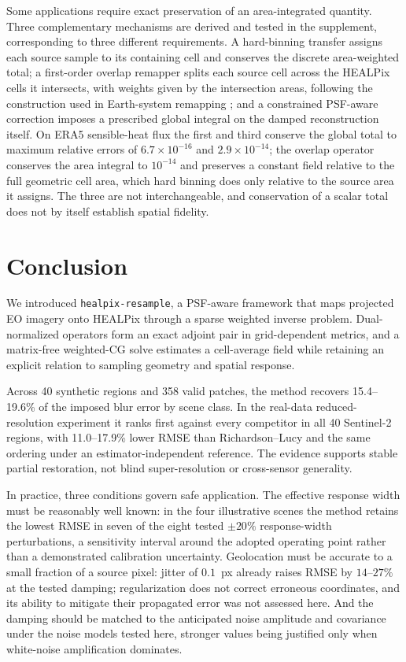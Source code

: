 \documentclass[journal]{IEEEtran}
\newcommand{\healpix}{HEALPix\xspace}
\begin{document}
Some applications require exact preservation of an area-integrated quantity.
Three complementary mechanisms are derived and tested in the supplement,
corresponding to three different requirements. A hard-binning transfer
assigns each source sample to its containing cell and conserves the discrete
area-weighted total; a first-order overlap remapper splits each source cell
across the \healpix cells it intersects, with weights given by the
intersection areas, following the construction used in Earth-system
remapping \cite{jones1999scrip,hill2004esmf,zhuang2020xesmf,ullrich2015tempestremap};
and a constrained PSF-aware correction imposes a prescribed global integral
on the damped reconstruction itself. On ERA5 sensible-heat
flux the first and third conserve the global total to maximum relative errors
of $6.7\times10^{-16}$ and $2.9\times10^{-14}$; the overlap operator conserves
the area integral to $10^{-14}$ and preserves a constant field relative to the
full geometric cell area, which hard binning does only relative to the source
area it assigns. The three are not interchangeable, and conservation of a
scalar total does not by itself establish spatial fidelity.

\section{Conclusion}

We introduced \texttt{healpix-resample}, a PSF-aware framework that maps
projected EO imagery onto \healpix through a sparse weighted inverse problem.
Dual-normalized operators form an exact adjoint pair in grid-dependent
metrics, and a matrix-free weighted-CG solve estimates a cell-average field
while retaining an explicit relation to sampling geometry and spatial
response.

Across 40 synthetic regions and 358 valid patches, the method recovers
15.4--19.6\% of the imposed blur error by scene class. In the real-data
reduced-resolution experiment it ranks first against every competitor in all
40 Sentinel-2 regions, with 11.0--17.9\% lower RMSE than Richardson--Lucy and
the same ordering under an estimator-independent reference. The evidence
supports stable partial restoration, not blind super-resolution or
cross-sensor generality.

In practice, three conditions govern safe application. The effective
response width must be reasonably well known: in the four illustrative
scenes the method retains the lowest RMSE in seven of the eight tested
$\pm20\%$ response-width perturbations, a sensitivity interval around the
adopted operating point rather than a demonstrated calibration uncertainty.
Geolocation must be accurate to
a small fraction of a source pixel: jitter of $0.1$~px already raises RMSE
by $14$--$27\%$ at the tested damping; regularization does not correct
erroneous coordinates, and its ability to mitigate their propagated error was
not assessed here.
And the damping should be matched to the anticipated noise amplitude and
covariance under the noise models tested here, stronger values being justified
only when white-noise amplification dominates.
\end{document}
